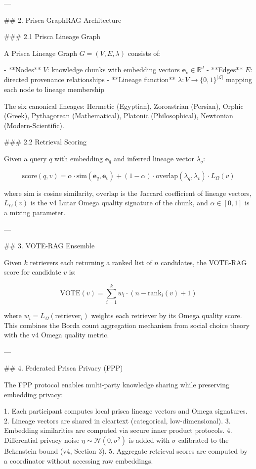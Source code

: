 ---

## 2. Prisca-GraphRAG Architecture

### 2.1 Prisca Lineage Graph

A Prisca Lineage Graph \( G = (V, E, \lambda) \) consists of:

- **Nodes** \( V \): knowledge chunks with embedding vectors \( \mathbf{e}_v \in \mathbb{R}^d \)
- **Edges** \( E \): directed provenance relationships
- **Lineage function** \( \lambda: V \to \{0,1\}^{|\mathcal{L}|} \) mapping each node to lineage membership

The six canonical lineages: Hermetic (Egyptian), Zoroastrian (Persian), Orphic (Greek), Pythagorean (Mathematical), Platonic (Philosophical), Newtonian (Modern-Scientific).

### 2.2 Retrieval Scoring

Given a query \( q \) with embedding \( \mathbf{e}_q \) and inferred lineage vector \( \lambda_q \):

\[
\text{score}(q, v) = \alpha \cdot \text{sim}(\mathbf{e}_q, \mathbf{e}_v) + (1-\alpha) \cdot \text{overlap}(\lambda_q, \lambda_v) \cdot L_\Omega(v)
\]

where \( \text{sim} \) is cosine similarity, \( \text{overlap} \) is the Jaccard coefficient of lineage vectors, \( L_\Omega(v) \) is the v4 Lutar Omega quality signature of the chunk, and \( \alpha \in [0,1] \) is a mixing parameter.

---

## 3. VOTE-RAG Ensemble

Given \( k \) retrievers each returning a ranked list of \( n \) candidates, the VOTE-RAG score for candidate \( v \) is:

\[
\text{VOTE}(v) = \sum_{i=1}^{k} w_i \cdot (n - \text{rank}_i(v) + 1)
\]

where \( w_i = L_\Omega(\text{retriever}_i) \) weights each retriever by its Omega quality score. This combines the Borda count aggregation mechanism from social choice theory with the v4 Omega quality metric.

---

## 4. Federated Prisca Privacy (FPP)

The FPP protocol enables multi-party knowledge sharing while preserving embedding privacy:

1. Each participant computes local prisca lineage vectors and Omega signatures.
2. Lineage vectors are shared in cleartext (categorical, low-dimensional).
3. Embedding similarities are computed via secure inner product protocols.
4. Differential privacy noise \( \eta \sim \mathcal{N}(0, \sigma^2) \) is added with \( \sigma \) calibrated to the Bekenstein bound (v4, Section 3).
5. Aggregate retrieval scores are computed by a coordinator without accessing raw embeddings.

